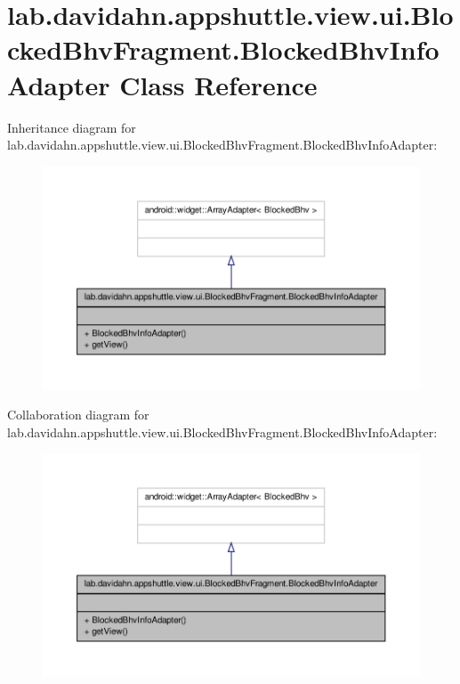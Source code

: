 \hypertarget{classlab_1_1davidahn_1_1appshuttle_1_1view_1_1ui_1_1_blocked_bhv_fragment_1_1_blocked_bhv_info_adapter}{\section{lab.\-davidahn.\-appshuttle.\-view.\-ui.\-Blocked\-Bhv\-Fragment.\-Blocked\-Bhv\-Info\-Adapter \-Class \-Reference}
\label{classlab_1_1davidahn_1_1appshuttle_1_1view_1_1ui_1_1_blocked_bhv_fragment_1_1_blocked_bhv_info_adapter}
}


\-Inheritance diagram for lab.\-davidahn.\-appshuttle.\-view.\-ui.\-Blocked\-Bhv\-Fragment.\-Blocked\-Bhv\-Info\-Adapter\-:
\nopagebreak
\begin{figure}[H]
\begin{center}
\leavevmode
\includegraphics[width=350pt]{classlab_1_1davidahn_1_1appshuttle_1_1view_1_1ui_1_1_blocked_bhv_fragment_1_1_blocked_bhv_info_adapter__inherit__graph}
\end{center}
\end{figure}


\-Collaboration diagram for lab.\-davidahn.\-appshuttle.\-view.\-ui.\-Blocked\-Bhv\-Fragment.\-Blocked\-Bhv\-Info\-Adapter\-:
\nopagebreak
\begin{figure}[H]
\begin{center}
\leavevmode
\includegraphics[width=350pt]{classlab_1_1davidahn_1_1appshuttle_1_1view_1_1ui_1_1_blocked_bhv_fragment_1_1_blocked_bhv_info_adapter__coll__graph}
\end{center}
\end{figure}
